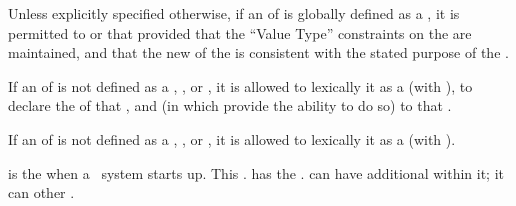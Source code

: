 Unless explicitly specified otherwise,
if an  of  
is globally defined as a  ,
it is permitted to  or  that 
provided that the ``Value Type'' constraints on the  
are maintained, and that the new  of the  
is consistent with the stated purpose of the .

If an  of  is not defined
as a  , , or ,
it is allowed to lexically  it as a  (\eg with ),
              to declare the  of that , 
          and 
              (in  which provide the ability to do so)
	      to  that .

If an  of  is not defined
as a  , , or ,
it is allowed to lexically  it as a  (\eg with ).


\endsubsubsubsubsection%

\endsubsubsubsection%

\endsubsubsection%


 is the  when 
a \clisp\ system starts up.  This   .
 has the  .
 can have additional   within it;
it can  other  .
 
